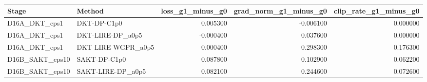 \begin{tabular}{llrrr}
\toprule
Stage & Method & loss_g1_minus_g0 & grad_norm_g1_minus_g0 & clip_rate_g1_minus_g0 \\
\midrule
D16A_DKT_eps1 & DKT-DP-C1p0 & 0.005300 & -0.006100 & 0.000000 \\
D16A_DKT_eps1 & DKT-LIRE-DP_a0p5 & -0.000400 & 0.037600 & 0.000000 \\
D16A_DKT_eps1 & DKT-LIRE-WGPR_a0p5 & -0.000400 & 0.298300 & 0.176300 \\
D16B_SAKT_eps10 & SAKT-DP-C1p0 & 0.087800 & 0.102900 & 0.062200 \\
D16B_SAKT_eps10 & SAKT-LIRE-DP_a0p5 & 0.082100 & 0.244600 & 0.072600 \\
\bottomrule
\end{tabular}
